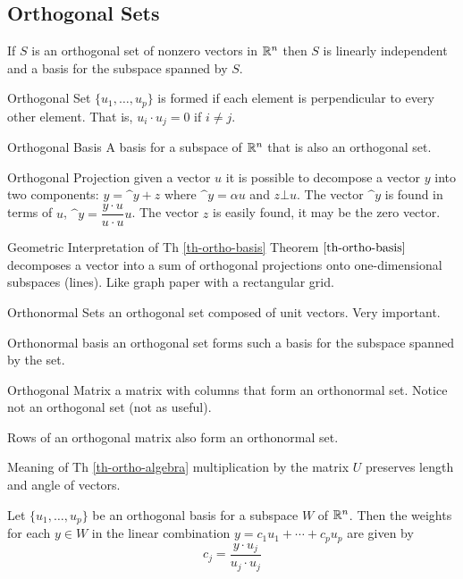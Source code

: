 \begin{card}
    \subsection{Orthogonal Sets}

    \begin{theorem}
    If $S$ is an orthogonal set of nonzero vectors in $\mathbb{R}^n$ then $S$
    is linearly independent and a basis for the subspace spanned by $S$.
    \end{theorem}

    \begin{compactdesc}
    \item[Orthogonal Set] $\{u_1, \dotsc, u_p\}$
        is formed if each element is perpendicular to every other element.
        That is, $u_i \cdot u_j = 0$ if $i \neq j$.
    \item[Orthogonal Basis] A basis for a subspace of $\mathbb{R}^n$ that is also
        an orthogonal set.
    \item[Orthogonal Projection] given a vector $u$ it is possible to
        decompose a vector $y$ into two components:
        $y = \^y + z$ where $\^y = \alpha u$ and $z \bot u$.
        The vector $\^y$ is found in terms of $u$, $\^y = \dfrac{y\cdot u}{u \cdot u}u$.
        The vector $z$ is easily found, it may be the zero vector.
    \item[Geometric Interpretation of Th \ref{th-ortho-basis}]
        Theorem $\ref{th-ortho-basis}$ decomposes a vector into a sum of
        orthogonal projections onto one-dimensional subspaces (lines).
        Like graph paper with a rectangular grid.
    \item[Orthonormal Sets] an orthogonal set composed of unit vectors.
        Very important.
    \item[Orthonormal basis] an orthogonal set forms such a basis for the
        subspace spanned by the set.
    \item[Orthogonal Matrix] a matrix with columns that form an orthonormal set.
        Notice not an orthogonal set (not as useful).
    \item[Rows of an orthogonal] matrix also form an orthonormal set.
    \item[Meaning of Th \ref{th-ortho-algebra}] multiplication by the matrix
        $U$ preserves length and angle of vectors.
    \end{compactdesc}

    \begin{theorem}\label{th-ortho-basis}
    Let $\{u_1, \dotsc, u_p\}$ be an orthogonal basis for a subspace $W$ of
    $\mathbb{R}^n$. Then the weights for each $y \in W$ in the linear combination
    $y = c_1u_1 + \dotsb + c_pu_p $
    are given by
    $$c_j = \frac{y \cdot u_j}{u_j \cdot u_j}$$
    \end{theorem}


\end{card}
